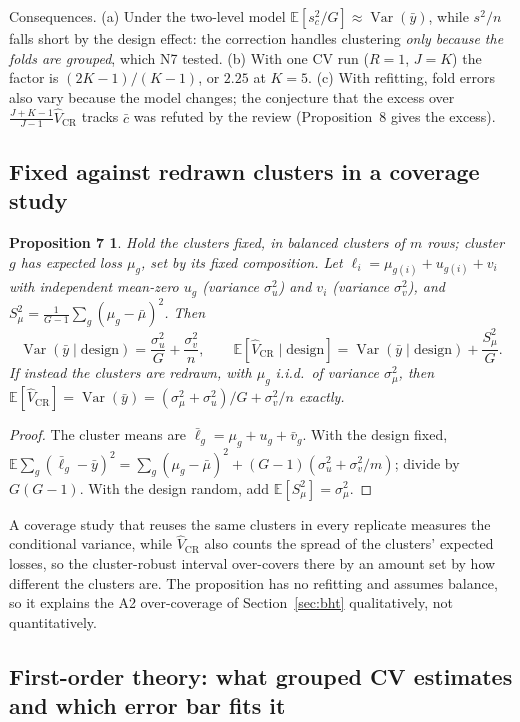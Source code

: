 \documentclass[11pt]{amsart}
\theoremstyle{plain}
\newtheorem*{prop7}{Proposition 7}
\theoremstyle{definition}
\theoremstyle{remark}
\newcommand{\Var}{\operatorname{Var}}
\newcommand{\E}{\mathbb{E}}
\newcommand{\VCR}{\hat V_{\mathrm{CR}}}
\newcommand{\fac}{\tfrac{J+K-1}{J-1}}
\begin{document}
Consequences. (a) Under the two-level model $\E[s_c^2/G]\approx\Var(\bar y)$, while $s^2/n$ falls short by the design effect: the correction handles clustering \emph{only because the folds are grouped}, which N7 tested. (b) With one CV run ($R=1$, $J=K$) the factor is $(2K-1)/(K-1)$, or $2.25$ at $K=5$. (c) With refitting, fold errors also vary because the model changes; the conjecture that the excess over $\fac\VCR$ tracks $\bar c$ was refuted by the review (Proposition~8 gives the excess).

\subsection{Fixed against redrawn clusters in a coverage study}

\begin{prop7}
Hold the clusters fixed, in balanced clusters of $m$ rows; cluster $g$ has expected loss $\mu_g$, set by its fixed composition. Let $\ell_i=\mu_{g(i)}+u_{g(i)}+v_i$ with independent mean-zero $u_g$ (variance $\sigma_u^2$) and $v_i$ (variance $\sigma_v^2$), and $S_\mu^2=\frac1{G-1}\sum_g(\mu_g-\bar\mu)^2$. Then
\[
\Var(\bar y\mid\text{design})=\frac{\sigma_u^2}{G}+\frac{\sigma_v^2}{n},\qquad
\E[\VCR\mid\text{design}]=\Var(\bar y\mid\text{design})+\frac{S_\mu^2}{G}.
\]
If instead the clusters are redrawn, with $\mu_g$ i.i.d.\ of variance $\sigma_\mu^2$, then $\E[\VCR]=\Var(\bar y)=(\sigma_\mu^2+\sigma_u^2)/G+\sigma_v^2/n$ exactly.
\end{prop7}

\begin{proof}
The cluster means are $\bar\ell_g=\mu_g+u_g+\bar v_g$. With the design fixed, $\E\sum_g(\bar\ell_g-\bar y)^2=\sum_g(\mu_g-\bar\mu)^2+(G-1)(\sigma_u^2+\sigma_v^2/m)$; divide by $G(G-1)$. With the design random, add $\E[S_\mu^2]=\sigma_\mu^2$.
\end{proof}

A coverage study that reuses the same clusters in every replicate measures the conditional variance, while $\VCR$ also counts the spread of the clusters' expected losses, so the cluster-robust interval over-covers there by an amount set by how different the clusters are. The proposition has no refitting and assumes balance, so it explains the A2 over-coverage of Section~\ref{sec:bht} qualitatively, not quantitatively.

\subsection{First-order theory: what grouped CV estimates and which error bar fits it}
\end{document}
